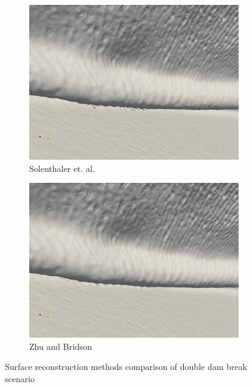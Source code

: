 \begin{figure}
\begin{center}
\begin{subfigure}[b]{0.48\textwidth}
			\includegraphics[width=\textwidth]{figures/SolenthalerEtAlForRelWorkDoubleDamBreak2.png}
			\caption{Solenthaler et. al.}
		\end{subfigure}
		\begin{subfigure}[b]{0.48\textwidth}
			\includegraphics[width=\textwidth]{figures/ZhuBridsonForRelatedWorksDoubleDamBreak2.png}
			\caption{Zhu and Bridson}
		\end{subfigure}

	\end{center}
	\caption{Surface reconstruction methods comparison of double dam break scenario}
	\label{fig:double_dam_break_comparison2}
\end{figure}

